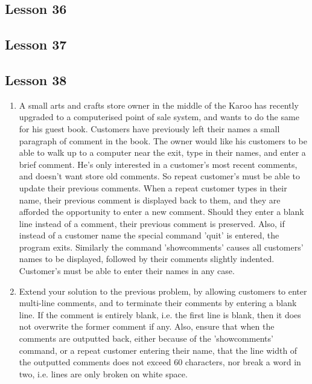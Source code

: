 \documentclass[a4paper,11pt]{article}
\begin{document}
\subsection{Lesson 36}


\subsection{Lesson 37}


\subsection{Lesson 38}

\begin{enumerate}
	\item A small arts and crafts store owner in the middle of the Karoo    has recently upgraded to a computerised point of sale system, and    wants to do the same for his guest book. Customers have previously    left their names a small paragraph of comment in the book. The owner    would like his customers to be able to walk up to a computer near    the exit, type in their names, and enter a brief comment. He's only    interested in a customer's most recent comments, and doesn't want    store old comments. So repeat customer's must be able to update    their previous comments. When a repeat customer types in their name,    their previous comment is displayed back to them, and they are    afforded the opportunity to enter a new comment. Should they enter a    blank line instead of a comment, their previous comment is    preserved. Also, if instead of a customer name the special command    'quit' is entered, the program exits. Similarly the command    'showcomments' causes all customers' names to be displayed, followed    by their comments slightly indented. Customer's must be able to    enter their names in any case.
	\item Extend your solution to the previous problem, by allowing    customers to enter multi-line comments, and to terminate their    comments by entering a blank line. If the comment is entirely blank,    i.e. the first line is blank, then it does not overwrite the former    comment if any. Also, ensure that when the comments are outputted    back, either because of the 'showcomments' command, or a repeat    customer entering their name, that the line width of the outputted    comments does not exceed 60 characters, nor break a word in two,    i.e. lines are only broken on white space.
\end{enumerate}
\end{document}
